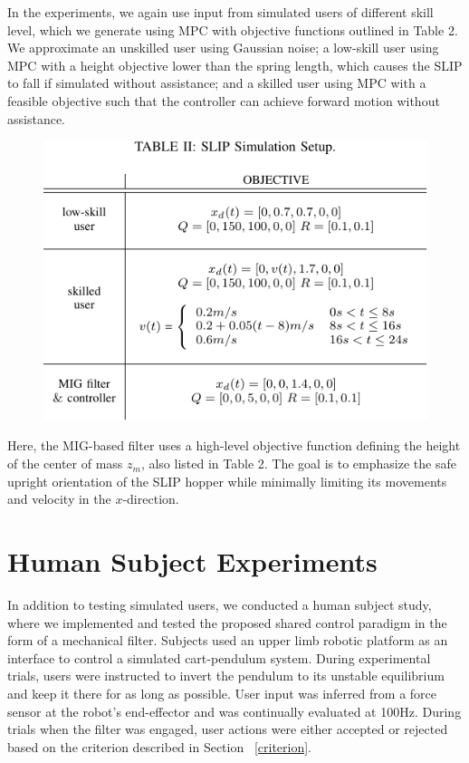In the experiments, we again use input from simulated users of different skill level, which we generate using MPC with objective functions outlined in Table 2. We approximate an unskilled user using Gaussian noise; a low-skill user using MPC with a height objective lower than the spring length, which causes the SLIP to fall if simulated without assistance; and a skilled user using MPC with a feasible objective such that the controller can achieve forward motion without assistance. 

\begin{figure}[h]
	\begin{center}
		\includegraphics[width=0.6\columnwidth, keepaspectratio]{SLIP_table2.pdf}\par
	\end{center}
\label{table_slip}
\end{figure}

Here, the MIG-based filter uses a high-level objective function defining the height of the center of mass $z_m$, also listed in Table 2. The goal is to emphasize the safe upright orientation of the SLIP hopper while minimally limiting its movements and velocity in the $x$-direction.


\section{Human Subject Experiments}
\label{section: human experiments}

In addition to testing simulated users, we conducted a human subject study, where we implemented and tested the proposed shared control paradigm in the form of a mechanical filter. Subjects used an upper limb robotic platform as an interface to control a simulated cart-pendulum system. During experimental trials, users were instructed to invert the pendulum to its unstable equilibrium and keep it there for as long as possible. User input was inferred from a force sensor at the robot's end-effector and was continually evaluated at 100Hz. During trials when the filter was engaged, user actions were either accepted or rejected based on the criterion described in Section ~\ref{criterion}. 


